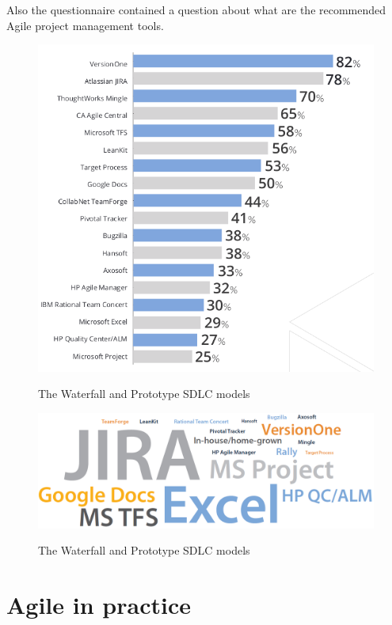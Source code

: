 	Also the questionnaire contained a question about what are the recommended Agile project management tools.
	
	\begin{figure}[H]
		\centering
		\includegraphics[width=.8\textwidth]{resources/Screenshot}\\
		\caption{The Waterfall and Prototype SDLC models}
	\end{figure}

	\begin{figure}[H]
		\centering
		\includegraphics[width=.8\textwidth]{resources/Untitled_4}\\
		\caption{The Waterfall and Prototype SDLC models}
	\end{figure}

\section{Agile in practice}


